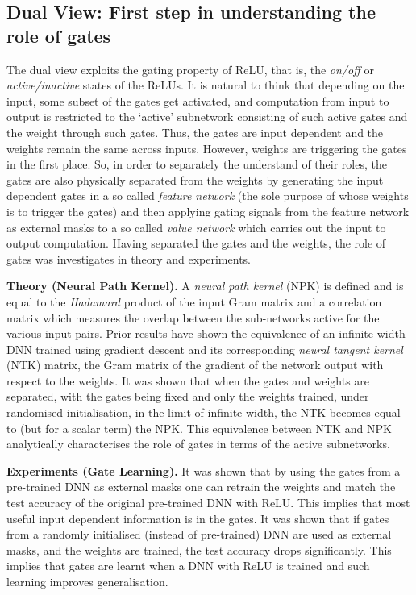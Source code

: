 \documentclass{article} %
\begin{document}
\subsection{Dual View: First step in understanding the role of gates}

The dual view exploits the gating property of ReLU, that is, the \emph{on/off} or \emph{active/inactive} states of the ReLUs. It is natural to think that depending on the input, some subset of the gates get activated, and computation from input to output is restricted to the `active' subnetwork consisting of such active gates and the weight through such gates. Thus, the gates are input dependent and the weights remain the same across inputs. However, weights are triggering the gates in the first place. So, in order to separately the understand of their roles, the gates are also physically separated from the weights by generating the input dependent gates in a so called \emph{feature network} (the sole purpose of whose weights is to trigger the gates) and then applying gating signals from the feature network as external masks to a so called \emph{value network} which carries out the input to output computation. Having separated the gates and the weights, the role of gates was investigates in theory and experiments.

\textbf{Theory (Neural Path Kernel).} A \emph{neural path kernel} (NPK) is defined and is equal to the \emph{Hadamard} product of the input Gram matrix and a correlation matrix which measures the overlap between the sub-networks active for the various input pairs. Prior results  \cite{arora2019exact,cao2019generalization,ntk} have shown the equivalence of an infinite width DNN trained using gradient descent and its corresponding \emph{neural tangent kernel} (NTK) matrix, the Gram matrix of the gradient of the network output with respect to the weights. It was shown that when the gates and weights are separated, with the gates being fixed and only the weights trained, under randomised initialisation, in the limit of infinite width, the NTK becomes equal to (but for a scalar term) the NPK. This equivalence between NTK and NPK analytically characterises the role of gates in terms of the active subnetworks.


\textbf{Experiments (Gate Learning).}  It was shown that by using the gates from a pre-trained DNN as external masks one can retrain the weights and match the test accuracy of the original pre-trained DNN with ReLU. 
This implies that most useful input dependent information is in the gates. It was shown that if gates from a randomly initialised (instead of pre-trained) DNN are used as external masks, and the weights are trained, the test accuracy drops significantly. This implies that gates are learnt when a DNN with ReLU is trained and such learning improves generalisation.
\end{document}
